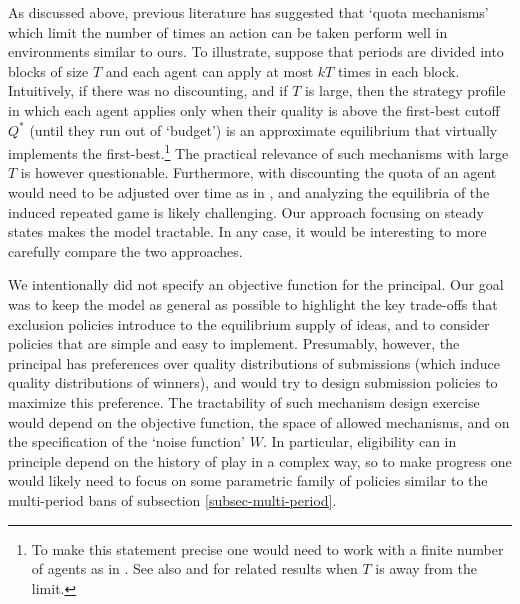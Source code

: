 \documentclass[12pt]{article}
\theoremstyle{plain}
\theoremstyle{definition}
\theoremstyle{remark}
\begin{document}
As discussed above, previous literature has suggested that `quota mechanisms' which limit the number of times an action can be taken perform well in environments similar to ours. To illustrate, suppose that periods are divided into blocks of size $T$ and each agent can apply at most $kT$ times in each block. Intuitively, if there was no discounting, and if $T$ is large, then the strategy profile in which each agent applies only when their quality is above the first-best cutoff $Q^*$ (until they run out of `budget') is an approximate equilibrium that virtually implements the first-best.\footnote{To make this statement precise one would need to work with a finite number of agents as in \citet{jackson2007overcoming}. See also \citet{hortala2010inefficiencies} and \citet{ball2023linking} for related results when $T$ is away from the limit.} The practical relevance of such mechanisms with large $T$ is however questionable. Furthermore, with discounting the quota of an agent would need to be adjusted over time as in \citet{frankel2016discounted}, and analyzing the equilibria of the induced repeated game is likely challenging. Our approach focusing on steady states makes the model tractable. In any case, it would be interesting to more carefully compare the two approaches.     


We intentionally did not specify an objective function for the principal. Our goal was to keep the model as general as possible to highlight the key trade-offs that exclusion policies introduce to the equilibrium supply of ideas, and to consider policies that are simple and easy to implement. Presumably, however, the principal has preferences over quality distributions of submissions (which induce quality distributions of winners), and would try to design submission policies to maximize this preference. The tractability of such mechanism design exercise would depend on the objective function, the space of allowed mechanisms, and on the specification of the `noise function' $W$. In particular, eligibility can in principle depend on the history of play in a complex way, so to make progress one would likely need to focus on some parametric family of policies similar to the multi-period bans of subsection \ref{subsec-multi-period}.  
\end{document}
